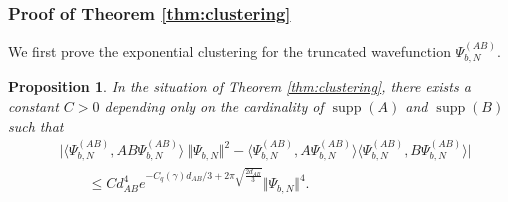 \documentclass[letterpaper, DIV=17]{scrartcl}
\newtheorem{prop}[theorem]{Proposition}
\numberwithin{equation}{section}
\theoremstyle{definition}
\DeclareMathOperator{\supp}{supp}
\begin{document}
\subsubsection{Proof of Theorem \ref{thm:clustering}}
We first prove the exponential clustering for the truncated wavefunction $\Psi_{b,N}^{(AB)}$.
\begin{prop} \label{prop:exponential clustering truncated}
	In the situation of Theorem \ref{thm:clustering}, there exists a constant $C>0$ depending only on the cardinality of $\supp(A)$ and $\supp(B)$ such that 
	\begin{equation}\label{eq:clustertrunc}
		\begin{split}
			&\big\vert \langle \Psi_{b,N}^{(AB)}, AB \Psi_{b,N}^{(AB)} \rangle\  \Vert \Psi_{b, N}\Vert^2 - \langle \Psi_{b,N}^{(AB)}, A \Psi_{b,N}^{(AB)} \rangle \langle \Psi_{b,N}^{(AB)}, B \Psi_{b,N}^{(AB)} \rangle\big\vert \\
			&\qquad\leq C d_{AB}^4 e^{-C_q(\gamma) d_{AB}/3+2\pi\sqrt{\frac{2d_{AB}}{3}}} \Vert \Psi_{b, N}\Vert^4.
		\end{split}
	\end{equation}
\end{prop}
\end{document}
